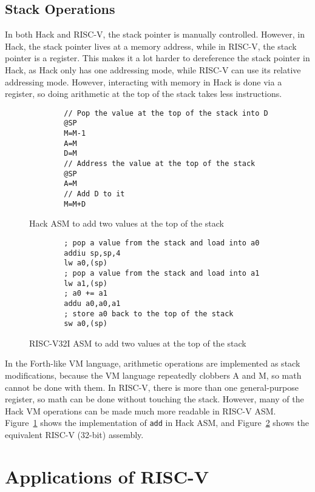 \subsection{Stack Operations}

In both Hack and RISC-V, the stack pointer is manually controlled. However, in
Hack, the stack pointer lives at a memory address, while in RISC-V, the stack
pointer is a register. This makes it a lot harder to dereference the stack
pointer in Hack, as Hack only has one addressing mode, while RISC-V can use its
relative addressing mode. However, interacting with memory in Hack is done via
a register, so doing arithmetic at the top of the stack takes less
instructions.

\begin{figure}
    \begin{verbatim}
        // Pop the value at the top of the stack into D
        @SP
        M=M-1
        A=M
        D=M
        // Address the value at the top of the stack
        @SP
        A=M
        // Add D to it
        M=M+D
    \end{verbatim}
    \caption{Hack ASM to add two values at the top of the stack}
    \label{hack-add}
\end{figure}

\begin{figure}
    \begin{verbatim}
        ; pop a value from the stack and load into a0
        addiu sp,sp,4
        lw a0,(sp)
        ; pop a value from the stack and load into a1
        lw a1,(sp)
        ; a0 += a1
        addu a0,a0,a1
        ; store a0 back to the top of the stack
        sw a0,(sp)
    \end{verbatim}
    \caption{RISC-V32I ASM to add two values at the top of the stack}
    \label{riscv-add}
\end{figure}

In the Forth-like VM language, arithmetic operations are implemented as stack
modifications, because the VM language repeatedly clobbers A and M, so math
cannot be done with them. In RISC-V, there is more than one general-purpose
register, so math can be done without touching the stack. However, many of the
Hack VM operations can be made much more readable in RISC-V ASM.
Figure~\ref{hack-add} shows the implementation of \verb|add| in Hack ASM, and
Figure~\ref{riscv-add} shows the equivalent RISC-V (32-bit) assembly.

\section{Applications of RISC-V}

